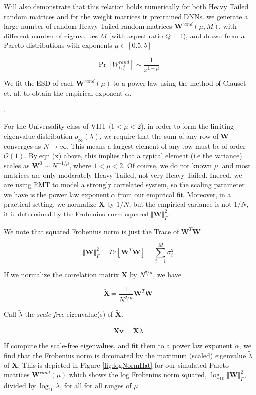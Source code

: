 Will also demonstrate that this relation holds numerically for both Heavy Tailed random matrices and for 
the weight matrices in pretrained DNNs.
  we generate a large number of random Heavy-Tailed random matrices $\mathbf{W}^{rand}(\mu,M)$, 
with different number of eigenvalues $M$ (with aspect ratio $Q=1$), 
and drawn from a Pareto distributions with exponents $\mu\in[0.5, 5]$

$$\Pr[{W}^{rand}_{i,j}]\sim\dfrac{1}{x^{1+\mu}}$$

We fit the ESD of each $\mathbf{W}^{rand}(\mu)$ to a power law using the method of Clauset et. al. to obtain the empirical exponent $\alpha$.  

.

For the Universality class of VHT ($1<\mu<2$), in order to form the limiting eigenvalue distribution $\rho_{\infty}(\lambda)$,
we require that the sum of any row of $\mathbf{W}$ converges as $N\rightarrow\infty$. This means a largest  element of any row
must be of order $\mathcal{O}(1)$.  By eqn (x) above, this implies that a typical element  (i.e the variance) scales as $\mathbf{W}^{0}\sim N^{-1/\mu}$, where $1<\mu<2$.
Of course, we do not known $\mu$, and most matrices are only moderately Heavy-Tailed, not very Heavy-Tailed.
Indeed, we are using RMT to model a strongly correlated system, so the scaling parameter
we have is the power law exponent $\alpha$ from our empirical fit.
Moreover, in a practical setting, we normalize $\mathbf{X}$ by $1/N$, but the empirical variance is not $1/N$, it is determined by the Frobenius norm squared
$\Vert\mathbf{W}\Vert^{2}_{F}$.   

We note that squared Frobenius norm is just the Trace of $\mathbf{W}^{T}\mathbf{W}$

$$\Vert\mathbf{W}\Vert_{F}^{2}=Tr[\mathbf{W}^{T}\mathbf{W}]=\sum_{i=1}^{M}\sigma^{2}_{i}$$

If we normalize the correlation matrix $\mathbf{X}$ by $N^{2/\mu}$, we have

$$\tilde{\mathbf{X}}=\dfrac{1}{N^{2/\mu}}\mathbf{W}^{T}\mathbf{W}$$

Call $\tilde{\lambda}$ the \emph{scale-free} eigenvalue(s) of $\tilde{\mathbf{X}}$.

$$\tilde{\mathbf{X}}\mathbf{v}=\tilde{\mathbf{X}}\tilde{\lambda}$$

If compute the scale-free eigenvalues, and fit them to a power law exponent $\tilde{\alpha}$, we find that the Frobenius norm is dominated by the maximum (scaled) eigenvalue $\tilde{\lambda}$ of $\tilde{\mathbf{X}}$.  
This is depicted in Figure 
  \ref{fig:logNormHat}
for our simulated Pareto matrices  $\mathbf{W}^{rand}(\mu)$ which shows
the log Frobenius norm squared, $\log_{10}\Vert\mathbf{W}\Vert^{2}_{F}$, divided by $\log_{10}\tilde{\lambda}$,
for all for all ranges of $\mu$

